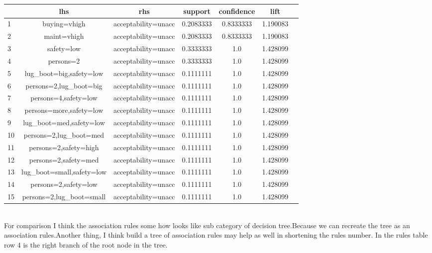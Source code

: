 \documentclass{article}
\begin{document}
\begin{tabular}{|l|*{6}{c|}}
	\hline
&lhs&rhs&support&confidence&lift\\
\hline
1&{buying=vhigh}&{acceptability=unacc}&0.2083333&0.8333333&1.190083\\
\hline
2&{maint=vhigh}&{acceptability=unacc}&0.2083333&0.8333333&1.190083\\\hline
3&{safety=low}&{acceptability=unacc}&0.3333333&1.0&1.428099\\\hline
4&{persons=2}&{acceptability=unacc}&0.3333333&1.0&1.428099\\\hline
5&{lug\_boot=big,safety=low}&{acceptability=unacc}&0.1111111&1.0&1.428099\\\hline
6&{persons=2,lug\_boot=big}&{acceptability=unacc}&0.1111111&1.0&1.428099\\\hline
7&{persons=4,safety=low}&{acceptability=unacc}&0.1111111&1.0&1.428099\\\hline
8&{persons=more,safety=low}&{acceptability=unacc}&0.1111111&1.0&1.428099\\\hline
9&{lug\_boot=med,safety=low}&{acceptability=unacc}&0.1111111&1.0&1.428099\\\hline
10&{persons=2,lug\_boot=med}&{acceptability=unacc}&0.1111111&1.0&1.428099\\\hline
11&{persons=2,safety=high}&{acceptability=unacc}&0.1111111&1.0&1.428099\\\hline
12&{persons=2,safety=med}&{acceptability=unacc}&0.1111111&1.0&1.428099\\\hline
13&{lug\_boot=small,safety=low}&{acceptability=unacc}&0.1111111&1.0&1.428099\\\hline
14&{persons=2,safety=low}&{acceptability=unacc}&0.1111111&1.0&1.428099\\\hline
15&{persons=2,lug\_boot=small}&{acceptability=unacc}&0.1111111&1.0&1.428099\\\hline
\end{tabular}\\
For comparison I think the association rules some how looks like sub category of decision tree.Because we can recreate the tree as an association rules.Another thing, I think build a tree of association rules may help as well in shortening the rules number. In the rules table row 4 is the right branch of the root node in the tree.
\end{document}

